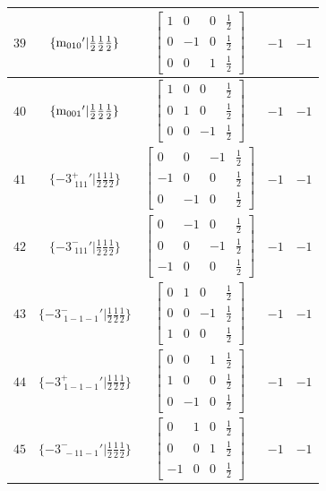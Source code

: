 \documentclass[fleqn,8pt]{jsarticle}
\begin{document}
\begin{longtable}{ccccc}
$ 39 $ & $ \{{\rm m}_{010}{}'|\frac{1}{2} \frac{1}{2} \frac{1}{2}\} $ & $ \begin{bmatrix} 1 & 0 & 0 & \frac{1}{2} \\ 0 & -1 & 0 & \frac{1}{2} \\ 0 & 0 & 1 & \frac{1}{2} \end{bmatrix} $ & $ -1 $ & $ -1 $ \\ \hline
$ 40 $ & $ \{{\rm m}_{001}{}'|\frac{1}{2} \frac{1}{2} \frac{1}{2}\} $ & $ \begin{bmatrix} 1 & 0 & 0 & \frac{1}{2} \\ 0 & 1 & 0 & \frac{1}{2} \\ 0 & 0 & -1 & \frac{1}{2} \end{bmatrix} $ & $ -1 $ & $ -1 $ \\ \hline
$ 41 $ & $ \{-3^{+}_{\,\,111}{}'|\frac{1}{2} \frac{1}{2} \frac{1}{2}\} $ & $ \begin{bmatrix} 0 & 0 & -1 & \frac{1}{2} \\ -1 & 0 & 0 & \frac{1}{2} \\ 0 & -1 & 0 & \frac{1}{2} \end{bmatrix} $ & $ -1 $ & $ -1 $ \\ \hline
$ 42 $ & $ \{-3^{-}_{\,\,111}{}'|\frac{1}{2} \frac{1}{2} \frac{1}{2}\} $ & $ \begin{bmatrix} 0 & -1 & 0 & \frac{1}{2} \\ 0 & 0 & -1 & \frac{1}{2} \\ -1 & 0 & 0 & \frac{1}{2} \end{bmatrix} $ & $ -1 $ & $ -1 $ \\ \hline
$ 43 $ & $ \{-3^{-}_{\,\,1-1-1}{}'|\frac{1}{2} \frac{1}{2} \frac{1}{2}\} $ & $ \begin{bmatrix} 0 & 1 & 0 & \frac{1}{2} \\ 0 & 0 & -1 & \frac{1}{2} \\ 1 & 0 & 0 & \frac{1}{2} \end{bmatrix} $ & $ -1 $ & $ -1 $ \\ \hline
$ 44 $ & $ \{-3^{+}_{\,\,1-1-1}{}'|\frac{1}{2} \frac{1}{2} \frac{1}{2}\} $ & $ \begin{bmatrix} 0 & 0 & 1 & \frac{1}{2} \\ 1 & 0 & 0 & \frac{1}{2} \\ 0 & -1 & 0 & \frac{1}{2} \end{bmatrix} $ & $ -1 $ & $ -1 $ \\ \hline
$ 45 $ & $ \{-3^{-}_{\,\,-11-1}{}'|\frac{1}{2} \frac{1}{2} \frac{1}{2}\} $ & $ \begin{bmatrix} 0 & 1 & 0 & \frac{1}{2} \\ 0 & 0 & 1 & \frac{1}{2} \\ -1 & 0 & 0 & \frac{1}{2} \end{bmatrix} $ & $ -1 $ & $ -1 $ \\ \hline

\end{longtable}
\end{document}
